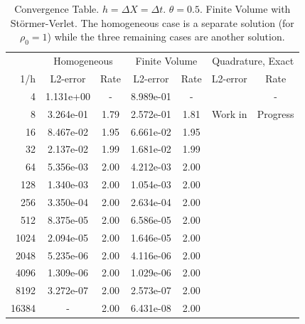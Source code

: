\documentclass{article}
\begin{document}
\begin{table}
\caption{Convergence Table. $h=\Delta X = \Delta t$. $\theta = 0.5$. Finite Volume with St\"{o}rmer-Verlet. The homogeneous case is a separate solution (for $\rho_0 = 1$) while the three remaining cases are another solution.}
\label{tab:ct2}
\centering
\begin{tabular}{rcccccc}    
 & \multicolumn{2}{c}{Homogeneous} & \multicolumn{2}{c}{Finite Volume} & \multicolumn{2}{c}{Quadrature, Exact}\\
1/h & L2-error & Rate & L2-error & Rate & L2-error & Rate \\
4 	  & 1.131e+00 & -    & 8.989e-01 & -    &  & - \\
8 	  & 3.264e-01 & 1.79 & 2.572e-01 & 1.81 & Work in & Progress \\
16 	  & 8.467e-02 & 1.95 & 6.661e-02 & 1.95 & \\ 
32 	  & 2.137e-02 & 1.99 & 1.681e-02 & 1.99 & \\
64 	  & 5.356e-03 & 2.00 & 4.212e-03 & 2.00 & \\
128   & 1.340e-03 & 2.00 & 1.054e-03 & 2.00 & \\
256   & 3.350e-04 & 2.00 & 2.634e-04 & 2.00 & \\
512   & 8.375e-05 & 2.00 & 6.586e-05 & 2.00 & \\
1024  & 2.094e-05 & 2.00 & 1.646e-05 & 2.00 & \\
2048  & 5.235e-06 & 2.00 & 4.116e-06 & 2.00 & \\
4096  & 1.309e-06 & 2.00 & 1.029e-06 & 2.00 & \\
8192  & 3.272e-07 & 2.00 & 2.573e-07 & 2.00 & \\ 
16384 &	- & 2.00 & 6.431e-08 & 2.00 &  \\
\end{tabular}
\end{table}
\end{document}
